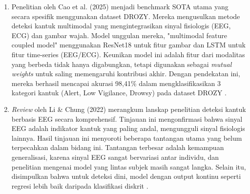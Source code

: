 \begin{enumerate}[noitemsep]
	\item Penelitian oleh Cao et al. (2025) menjadi benchmark SOTA utama yang secara spesifik menggunakan dataset DROZY. Mereka mengusulkan metode deteksi kantuk multimodal yang mengintegrasikan sinyal fisiologis (EEG, ECG) dan gambar wajah. Model unggulan mereka, "multimodal feature coupled model" menggunakan ResNet18 untuk fitur gambar dan LSTM untuk fitur time-series (EEG/ECG). Keunikan model ini adalah fitur dari modalitas yang berbeda tidak hanya digabungkan, tetapi digunakan sebagai \textit{mutual weights} untuk saling memengaruhi kontribusi akhir. Dengan pendekatan ini, mereka berhasil mencapai akurasi 98,41\% dalam mengklasifikasikan 3 kategori kantuk (Alert, Low Vigilance, Drowsy) pada dataset DROZY \cite{Cao2025Optimized}.

	\item \textit{Review} oleh Li \& Chung (2022)  merangkum lanskap penelitian deteksi kantuk berbasis EEG secara komprehensif. Tinjauan ini mengonfirmasi bahwa sinyal EEG adalah indikator kantuk yang paling andal, mengungguli sinyal fisiologis lainnya. Hasil tinjauan ini menyoroti beberapa tantangan utama yang belum terpecahkan dalam bidang ini. Tantangan terbesar adalah kemampuan generalisasi, karena sinyal EEG sangat bervariasi antar individu, dan penelitian mengenai model yang lintas subjek masih sangat langka. Selain itu, disimpulkan bahwa untuk deteksi dini, model dengan output kontinu seperti regresi lebih baik daripada klasifikasi diskrit \cite{Wang2022}.
\end{enumerate}

